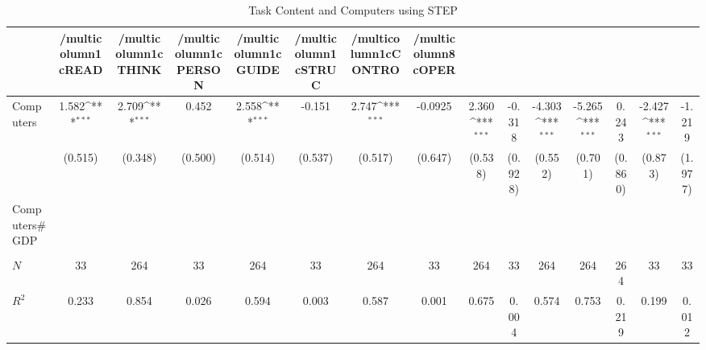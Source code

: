 \begin{table}[htbp]\centering
\def\sym#1{\ifmmode^{#1}\else\(^{#1}\)\fi}
\caption{Task Content and Computers using STEP}
\begin{tabular}{l*{14}{c}}
\hline\hline
            &/multicolumn{1}{c}{READ}&/multicolumn{1}{c}{THINK}&/multicolumn{1}{c}{PERSON}&/multicolumn{1}{c}{GUIDE}&/multicolumn{1}{c}{STRUC}&/multicolumn{1}{c}{CONTRO}&/multicolumn{8}{c}{OPER}                                                                                                                                                       \\
\hline
Computers   &       1.582\sym{***}&       2.709\sym{***}&       0.452         &       2.558\sym{***}&      -0.151         &       2.747\sym{***}&     -0.0925         &       2.360\sym{***}&      -0.318         &      -4.303\sym{***}&      -5.265\sym{***}&       0.243         &      -2.427\sym{***}&      -1.219         \\
            &     (0.515)         &     (0.348)         &     (0.500)         &     (0.514)         &     (0.537)         &     (0.517)         &     (0.647)         &     (0.538)         &     (0.928)         &     (0.552)         &     (0.701)         &     (0.860)         &     (0.873)         &     (1.977)         \\
[1em]
Computers#GDP&                     &                     &                     &                     &                     &                     &                     &                     &                     &                     &                     &                     &                     &                     \\
            &                     &                     &                     &                     &                     &                     &                     &                     &                     &                     &                     &                     &                     &                     \\
\hline
\(N\)       &          33         &         264         &          33         &         264         &          33         &         264         &          33         &         264         &          33         &         264         &         264         &         264         &          33         &          33         \\
\(R^{2}\)   &       0.233         &       0.854         &       0.026         &       0.594         &       0.003         &       0.587         &       0.001         &       0.675         &       0.004         &       0.574         &       0.753         &       0.219         &       0.199         &       0.012         \\
\hline\hline
\end{tabular}
\end{table}
